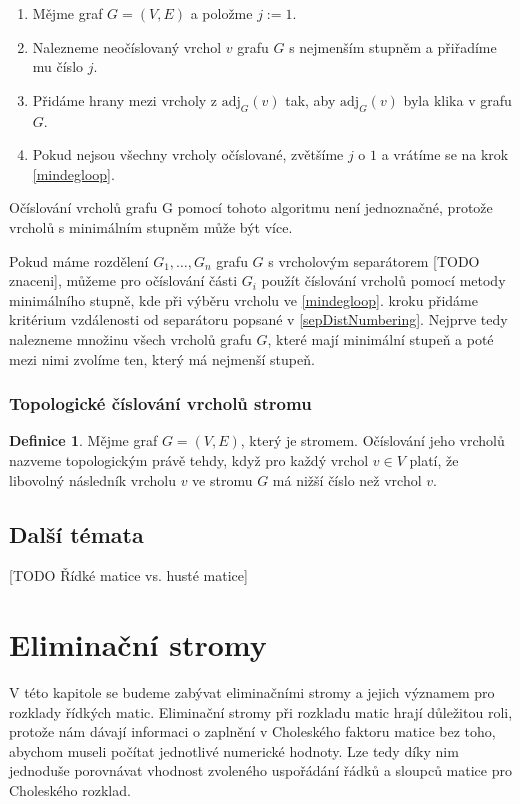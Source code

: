 \documentclass[11pt,american,czech,oneside]{book}
\theoremstyle{plain}
\theoremstyle{definition}
\newtheorem{definition}{Definice}
\begin{document}
\begin{enumerate}
  \item Mějme graf $G=(V,E)$ a položme $j:=1$.
  \item \label{mindegloop}
      Nalezneme neočíslovaný vrchol $v$ grafu $G$ s nejmenším stupněm a přiřadíme mu číslo $j$.
  \item Přidáme hrany mezi vrcholy z $\mathrm{adj}_G(v)$ tak, aby $\mathrm{adj}_G(v)$ byla klika v grafu $G$.
  \item Pokud nejsou všechny vrcholy očíslované, zvětšíme $j$ o $1$ a vrátíme se na krok \ref{mindegloop}.
\end{enumerate}

Očíslování vrcholů grafu G pomocí tohoto algoritmu není jednoznačné, protože vrcholů s minimálním stupněm může být více.

Pokud máme rozdělení $G_1, \ldots, G_n$ grafu $G$ s vrcholovým separátorem [TODO znaceni], můžeme pro očíslování části $G_i$ použít
číslování vrcholů pomocí metody minimálního stupně, kde při výběru vrcholu ve \ref{mindegloop}. kroku přidáme kritérium vzdálenosti od separátoru
popsané v \ref{sepDistNumbering}. Nejprve tedy nalezneme množinu všech vrcholů grafu $G$, které mají minimální stupeň
a poté mezi nimi zvolíme ten, který má nejmenší stupeň.

\subsection{Topologické číslování vrcholů stromu}
\begin{definition}
    Mějme graf $G = (V,E)$, který je stromem. Očíslování jeho vrcholů nazveme topologickým právě tehdy,
    když pro každý vrchol $v \in V$ platí, že libovolný následník vrcholu $v$ ve stromu $G$ má nižší číslo než vrchol $v$.
\end{definition}

\section{Další témata}
[TODO Řídké matice vs. husté matice]



\chapter{Eliminační stromy}
V této kapitole se budeme zabývat eliminačními stromy a jejich významem pro rozklady řídkých matic.
Eliminační stromy při rozkladu matic hrají důležitou roli, protože nám dávají informaci o zaplnění
v Choleského faktoru matice bez toho, abychom museli počítat jednotlivé numerické hodnoty.
Lze tedy díky nim jednoduše porovnávat vhodnost zvoleného uspořádání řádků a sloupců matice pro Choleského rozklad.
\end{document}
